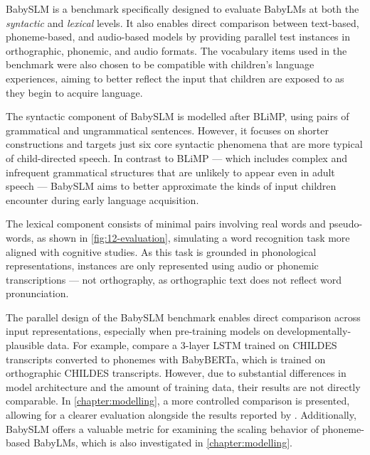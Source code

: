 

BabySLM \citep{lavechin} is a benchmark specifically designed to evaluate BabyLMs at both the \emph{syntactic} and \emph{lexical} levels. It also enables direct comparison between text-based, phoneme-based, and audio-based models by providing parallel test instances in orthographic, phonemic, and audio formats. The vocabulary items used in the benchmark were also chosen to be compatible with children's language experiences, aiming to better reflect the input that children are exposed to as they begin to acquire language. 

The syntactic component of BabySLM is modelled after BLiMP, using pairs of grammatical and ungrammatical sentences. However, it focuses on shorter constructions and targets just six core syntactic phenomena that are more typical of child-directed speech. In contrast to BLiMP --- which includes complex and infrequent grammatical structures that are unlikely to appear even in adult speech --- BabySLM aims to better approximate the kinds of input children encounter during early language acquisition. 

The lexical component consists of minimal pairs involving real words and pseudo-words, as shown in \cref{fig:12-evaluation}, simulating a word recognition task more aligned with cognitive studies. As this task is grounded in phonological representations, instances are only represented using audio or phonemic transcriptions --- not orthography, as orthographic text does not reflect word pronunciation. 

The parallel design of the BabySLM benchmark enables direct comparison across input representations, especially when pre-training models on developmentally-plausible data. For example, \citet{lavechin} compare a 3-layer LSTM trained on CHILDES transcripts converted to phonemes with BabyBERTa, which is trained on orthographic CHILDES transcripts. However, due to substantial differences in model architecture and the amount of training data, their results are not directly comparable. In \cref{chapter:modelling}, a more controlled comparison is presented, allowing for a clearer evaluation alongside the results reported by \citet{lavechin}. Additionally, BabySLM offers a valuable metric for examining the scaling behavior of phoneme-based BabyLMs, which is also investigated in \cref{chapter:modelling}. 

